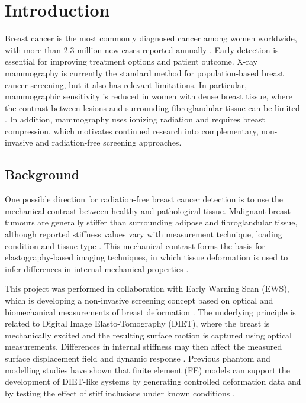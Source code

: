 \section{Introduction}

Breast cancer is the most commonly diagnosed cancer among women worldwide, with more than 2.3 million new cases reported annually \cite{WHO2025}. Early detection is essential for improving treatment options and patient outcome. X-ray mammography is currently the standard method for population-based breast cancer screening, but it also has relevant limitations. In particular, mammographic sensitivity is reduced in women with dense breast tissue, where the contrast between lesions and surrounding fibroglandular tissue can be limited \cite{VonEuler-Chelpin2019, Bakker2019}. In addition, mammography uses ionizing radiation and requires breast compression, which motivates continued research into complementary, non-invasive and radiation-free screening approaches.

\subsection{Background}

One possible direction for radiation-free breast cancer detection is to use the mechanical contrast between healthy and pathological tissue. Malignant breast tumours are generally stiffer than surrounding adipose and fibroglandular tissue, although reported stiffness values vary with measurement technique, loading condition and tissue type \cite{Samani2007, Ramiao2016, Goodbrake2022}. This mechanical contrast forms the basis for elastography-based imaging techniques, in which tissue deformation is used to infer differences in internal mechanical properties \cite{Patel2022, Patel2021, Jamshidi2024}.

This project was performed in collaboration with Early Warning Scan (EWS), which is developing a non-invasive screening concept based on optical and biomechanical measurements of breast deformation \cite{EarlyWarningScanWebsite}. The underlying principle is related to Digital Image Elasto-Tomography (DIET), where the breast is mechanically excited and the resulting surface motion is captured using optical measurements. Differences in internal stiffness may then affect the measured surface displacement field and dynamic response \cite{Peters2004, VanHouten2011, Fitzjohn2022}. Previous phantom and modelling studies have shown that finite element (FE) models can support the development of DIET-like systems by generating controlled deformation data and by testing the effect of stiff inclusions under known conditions \cite{Kashif2013, Ismail2018}.

